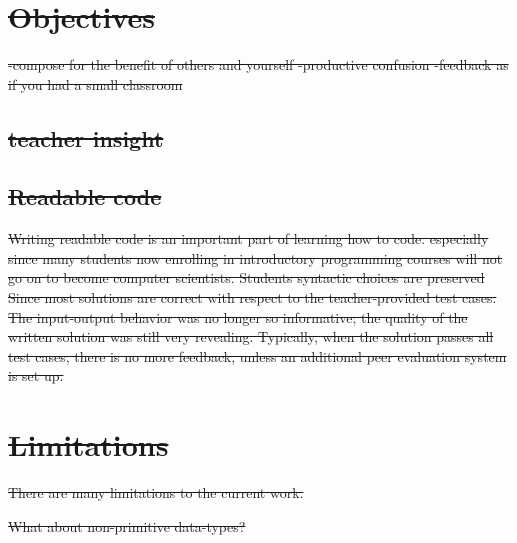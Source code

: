 \documentclass[12pt,twoside]{mitthesis}
\providecommand{\DIFdeltex}[1]{{\protect\color{red}\sout{#1}}}                      %
\providecommand{\DIFdel}[1]{\texorpdfstring{\DIFdeltex{#1}}{}} %
\begin{document}
{{{{{{{{{{\section{\DIFdel{Objectives}}
\addtocounter{section}{-1}%

\DIFdel{-compose for the benefit of others and yourself
-productive confusion
-feedback as if you had a small classroom
}\subsection{\DIFdel{teacher insight}}
\addtocounter{subsection}{-1}%
\subsection{\DIFdel{Readable code}}
\addtocounter{subsection}{-1}%
\DIFdel{Writing readable code is an important part of learning how to code. especially since many students now enrolling in introductory programming courses will not go on to become computer scientists. Students syntactic choices are preserved
Since most solutions are correct with respect to the teacher-provided test cases. The input-output behavior was no longer so informative; the quality of the written solution was still very revealing. Typically, when the solution passes all test cases, there is no more feedback, unless an additional peer evaluation system is set up.
}%

\section{\DIFdel{Limitations}}
\addtocounter{section}{-1}%

\DIFdel{There are many limitations to the current work. 
}%

\DIFdel{What about non-primitive data-types?
}%




}}}}}}}}}}
\end{document}
